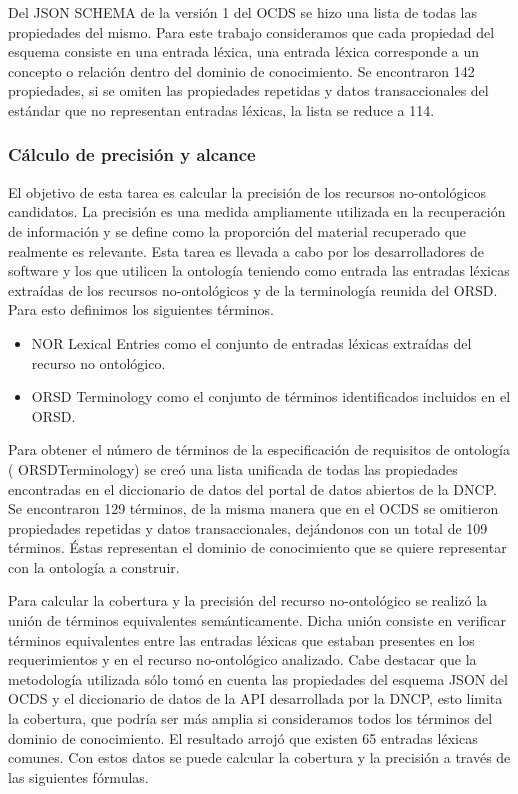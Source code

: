 Del JSON SCHEMA de la versión 1 del OCDS se hizo una lista de todas las propiedades del mismo. Para este trabajo consideramos que cada propiedad del esquema consiste en una entrada léxica, una entrada léxica corresponde a un concepto o relación dentro del dominio de conocimiento. Se encontraron 142 propiedades, si se omiten las propiedades repetidas y datos transaccionales del estándar que no representan entradas léxicas, la lista se reduce a 114.

\subsubsection{Cálculo de precisión y alcance}

El objetivo de esta tarea es calcular la precisión de los recursos no-ontológicos candidatos. La precisión es una medida ampliamente utilizada en la recuperación de información y se define como la proporción del material recuperado que realmente es relevante. Esta tarea es llevada a cabo por los desarrolladores de software y los que utilicen la ontología teniendo como entrada las entradas léxicas extraídas de los recursos no-ontológicos y de la terminología reunida del ORSD. Para esto definimos los siguientes términos.

\begin{itemize}
    \item NOR Lexical Entries como el conjunto de entradas léxicas extraídas del recurso no ontológico.	
    \item ORSD Terminology como el conjunto de términos identificados incluidos en el ORSD. 
\end{itemize}
Para obtener el número de términos de la especificación de requisitos de ontología ( ORSDTerminology) se creó una lista unificada de todas las propiedades encontradas en el diccionario de datos del portal de datos abiertos de la DNCP.  Se encontraron 129 términos, de la misma manera que en el OCDS se omitieron propiedades repetidas y datos transaccionales, dejándonos con un total de 109 términos. Éstas representan el dominio de conocimiento que se quiere representar con la ontología a construir.

Para calcular la cobertura y la precisión del recurso no-ontológico se realizó la unión de términos equivalentes semánticamente. Dicha unión consiste en verificar términos equivalentes entre las entradas léxicas que estaban presentes en los requerimientos y en el recurso no-ontológico analizado. Cabe destacar que la metodología utilizada sólo tomó en cuenta las propiedades del esquema JSON del OCDS y el diccionario de datos de la API desarrollada por la DNCP, esto limita la cobertura, que podría ser más amplia si consideramos todos los términos del dominio de conocimiento. El resultado arrojó que existen 65 entradas léxicas comunes. Con estos datos se puede calcular la cobertura y la precisión a través de las siguientes fórmulas.

